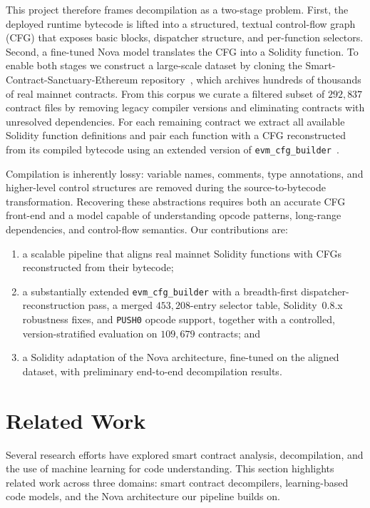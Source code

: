 \documentclass{stylefiles/capstone}
\begin{document}
This project therefore frames decompilation as a two-stage problem. First, the
deployed runtime bytecode is lifted into a structured, textual control-flow graph
(CFG) that exposes basic blocks, dispatcher structure, and per-function selectors.
Second, a fine-tuned Nova model translates the CFG into a Solidity function. To
enable both stages we construct a large-scale dataset by cloning the
Smart-Contract-Sanctuary-Ethereum repository~\cite{smart_contract_sanctuary},
which archives hundreds of thousands of real mainnet contracts. From this corpus
we curate a filtered subset of $292{,}837$ contract files by removing legacy
compiler versions and eliminating contracts with unresolved dependencies. For
each remaining contract we extract all available Solidity function definitions and
pair each function with a CFG reconstructed from its compiled bytecode using an
extended version of \texttt{evm\_cfg\_builder}~\cite{evm_cfg_builder}.

Compilation is inherently lossy: variable names, comments, type annotations, and
higher-level control structures are removed during the source-to-bytecode
transformation. Recovering these abstractions requires both an accurate CFG
front-end and a model capable of understanding opcode patterns, long-range
dependencies, and control-flow semantics. Our contributions are:

\begin{enumerate}
  \item a scalable pipeline that aligns real mainnet Solidity functions with CFGs
        reconstructed from their bytecode;
  \item a substantially extended \texttt{evm\_cfg\_builder} with a breadth-first
        dispatcher-reconstruction pass, a merged $453{,}208$-entry selector
        table, Solidity~0.8.x robustness fixes, and \texttt{PUSH0} opcode support,
        together with a controlled, version-stratified evaluation on $109{,}679$
        contracts; and
  \item a Solidity adaptation of the Nova architecture, fine-tuned on the aligned
        dataset, with preliminary end-to-end decompilation results.
\end{enumerate}

\section{Related Work}

Several research efforts have explored smart contract analysis, decompilation, and
the use of machine learning for code understanding. This section highlights
related work across three domains: smart contract decompilers, learning-based code
models, and the Nova architecture our pipeline builds on.
\end{document}
